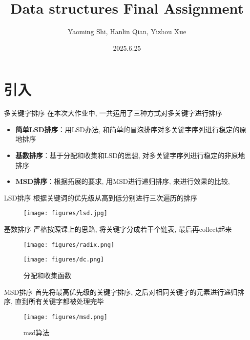 \documentclass{beamer}
\title{Data structures Final Assignment}
\author{Yaoming Shi, Hanlin Qian, Yizhou Xue}
\institute{UCAS}
\date{2025.6.25}
\begin{document}
\maketitle

\section{引入}

\begin{frame}{多关键字排序}
  在本次大作业中, 一共运用了三种方式对多关键字进行排序
  \begin{itemize}
    \item \textbf{简单LSD排序}：用LSD办法, 和简单的冒泡排序对多关键字序列进行稳定的原地排序
    \item \textbf{基数排序}：基于分配和收集和LSD的思想, 对多关键字序列进行稳定的非原地排序
    \item \textbf{MSD排序}：根据拓展的要求, 用MSD进行递归排序, 来进行效果的比较,
  \end{itemize}
\end{frame}

\begin{frame}{LSD排序}
  根据关键词的优先级从高到低分别进行三次遍历的排序
  \begin{figure}
    \centering
    \texttt{[image: figures/lsd.jpg]}
  \end{figure}
\end{frame}

\begin{frame}{基数排序}
  严格按照课上的思路, 将关键字分成若干个链表, 最后再collect起来
  \begin{figure}
    \centering
    \begin{minipage}{0.49\linewidth}
      \centering
      \texttt{[image: figures/radix.png]}
      \caption*{基数排序}
    \end{minipage}
    \begin{minipage}{0.49\linewidth}
      \centering
      \texttt{[image: figures/dc.png]}
      \caption*{分配和收集函数}
    \end{minipage}
  \end{figure}
\end{frame}

\begin{frame}{MSD排序}
  首先将最高优先级的关键字排序, 之后对相同关键字的元素进行递归排序, 直到所有关键字都被处理完毕
  \begin{figure}
    \centering
    \texttt{[image: figures/msd.png]}
    \caption*{msd算法}
  \end{figure}
\end{frame}
\end{document}
